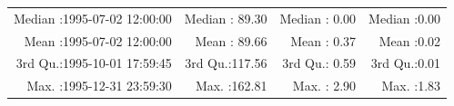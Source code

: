 \documentclass[
  10pt,
  a4paper,oneside]{article}
\begin{document}
\begin{longtable}[]{@{}rrrr@{}}
\begin{minipage}[t]{0.34\columnwidth}
Median :1995-07-02 12:00:00\strut
\end{minipage} & \begin{minipage}[t]{0.19\columnwidth}\raggedleft
Median : 89.30\strut
\end{minipage} & \begin{minipage}[t]{0.18\columnwidth}\raggedleft
Median : 0.00\strut
\end{minipage} & \begin{minipage}[t]{0.18\columnwidth}\raggedleft
Median :0.00\strut
\end{minipage}\tabularnewline
\begin{minipage}[t]{0.34\columnwidth}\raggedleft
Mean :1995-07-02 12:00:00\strut
\end{minipage} & \begin{minipage}[t]{0.19\columnwidth}\raggedleft
Mean : 89.66\strut
\end{minipage} & \begin{minipage}[t]{0.18\columnwidth}\raggedleft
Mean : 0.37\strut
\end{minipage} & \begin{minipage}[t]{0.18\columnwidth}\raggedleft
Mean :0.02\strut
\end{minipage}\tabularnewline
\begin{minipage}[t]{0.34\columnwidth}\raggedleft
3rd Qu.:1995-10-01 17:59:45\strut
\end{minipage} & \begin{minipage}[t]{0.19\columnwidth}\raggedleft
3rd Qu.:117.56\strut
\end{minipage} & \begin{minipage}[t]{0.18\columnwidth}\raggedleft
3rd Qu.: 0.59\strut
\end{minipage} & \begin{minipage}[t]{0.18\columnwidth}\raggedleft
3rd Qu.:0.01\strut
\end{minipage}\tabularnewline
\begin{minipage}[t]{0.34\columnwidth}\raggedleft
Max. :1995-12-31 23:59:30\strut
\end{minipage} & \begin{minipage}[t]{0.19\columnwidth}\raggedleft
Max. :162.81\strut
\end{minipage} & \begin{minipage}[t]{0.18\columnwidth}\raggedleft
Max. : 2.90\strut
\end{minipage} & \begin{minipage}[t]{0.18\columnwidth}\raggedleft
Max. :1.83\strut
\end{minipage}\tabularnewline

\end{longtable}
\end{document}

